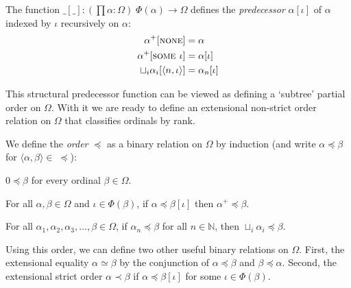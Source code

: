 \begin{definition}%
The function $\_[\_] : (\prod \alpha : \Omega) \; \Phi(\alpha) \rightarrow
\Omega$ defines the \emph{predecessor} $\alpha[\iota]$ of $\alpha$
indexed by $\iota$ recursively on $\alpha$:
\begin{align*}
  \alpha^+[\textsc{none}]                     &= \alpha \\
  \alpha^+[\textsc{some $\iota$}]             &= \alpha[\iota] \\
  \sqcup_i \alpha_i[\langle n, \iota \rangle] &= \alpha_n[\iota]
\end{align*}
\end{definition}


This structural predecessor function can be viewed as defining a `subtree'
partial order on $\Omega$. With it we are ready to define an extensional
non-strict order relation on $\Omega$ that classifies ordinals by rank.

\begin{definition}\label{def:order}%
We define the \emph{order} $\preceq$ as a binary relation on $\Omega$ by
induction (and write $\alpha \preceq \beta$ for $\langle \alpha, \beta \rangle
\in \; \preceq$):
\begin{compactenum}
  \item
    $0 \preceq \beta$ for every ordinal $\beta \in \Omega$.
  \item\label{def:order:succ}
    For all $\alpha, \beta \in \Omega$ and $\iota \in \Phi(\beta)$, if
    $\alpha \preceq \beta[\iota]$ then $\alpha^+ \preceq \beta$.
  \item
    For all $\alpha_1, \alpha_2, \alpha_3, \ldots, \beta \in \Omega$, if
    $\alpha_n \preceq \beta$ for all $n \in \mathbb{N}$, then $\sqcup_i
    \alpha_i \preceq \beta$.
\end{compactenum}
\end{definition}

Using this order, we can define two other useful binary relations on
$\Omega$. First, the extensional equality $\alpha \simeq \beta$ by the
conjunction of $\alpha \preceq \beta$ and $\beta \preceq \alpha$. Second, the
extensional strict order $\alpha \prec \beta$ if $\alpha \preceq
\beta[\iota]$ for some $\iota \in \Phi(\beta)$.


